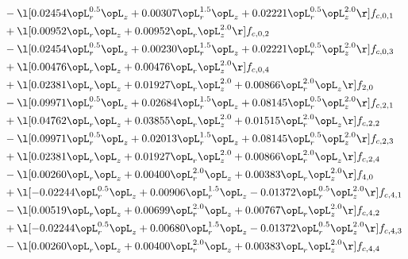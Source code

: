 \begin{alignat}{2}
& - \l[  0.02454 \opL_r^{0.5} \opL_z +  0.00307 \opL_r^{1.5} \opL_z +  0.02221 \opL_r^{0.5} \opL_z^{2.0}  \r] f_{c,0,1} \nonumber \\ 
& + \l[  0.00952 \opL_r \opL_z +  0.00952 \opL_r \opL_z^{2.0}  \r] f_{c,0,2} \nonumber \\ 
& - \l[  0.02454 \opL_r^{0.5} \opL_z +  0.00230 \opL_r^{1.5} \opL_z +  0.02221 \opL_r^{0.5} \opL_z^{2.0}  \r] f_{c,0,3} \nonumber \\ 
& + \l[  0.00476 \opL_r \opL_z +  0.00476 \opL_r \opL_z^{2.0}  \r] f_{c,0,4} \nonumber \\ 
& + \l[  0.02381 \opL_r \opL_z +  0.01927 \opL_r \opL_z^{2.0} +  0.00866 \opL_r^{2.0} \opL_z  \r] f_{2,0} \nonumber \\ 
& - \l[  0.09971 \opL_r^{0.5} \opL_z +  0.02684 \opL_r^{1.5} \opL_z +  0.08145 \opL_r^{0.5} \opL_z^{2.0}  \r] f_{c,2,1} \nonumber \\ 
& + \l[  0.04762 \opL_r \opL_z +  0.03855 \opL_r \opL_z^{2.0} +  0.01515 \opL_r^{2.0} \opL_z  \r] f_{c,2,2} \nonumber \\ 
& - \l[  0.09971 \opL_r^{0.5} \opL_z +  0.02013 \opL_r^{1.5} \opL_z +  0.08145 \opL_r^{0.5} \opL_z^{2.0}  \r] f_{c,2,3} \nonumber \\ 
& + \l[  0.02381 \opL_r \opL_z +  0.01927 \opL_r \opL_z^{2.0} +  0.00866 \opL_r^{2.0} \opL_z  \r] f_{c,2,4} \nonumber \\ 
& - \l[  0.00260 \opL_r \opL_z +  0.00400 \opL_r^{2.0} \opL_z +  0.00383 \opL_r \opL_z^{2.0}  \r] f_{4,0} \nonumber \\ 
& + \l[  -0.02244 \opL_r^{0.5} \opL_z +  0.00906 \opL_r^{1.5} \opL_z   -0.01372 \opL_r^{0.5} \opL_z^{2.0}  \r] f_{c,4,1} \nonumber \\ 
& - \l[  0.00519 \opL_r \opL_z +  0.00699 \opL_r^{2.0} \opL_z +  0.00767 \opL_r \opL_z^{2.0}  \r] f_{c,4,2} \nonumber \\ 
& + \l[  -0.02244 \opL_r^{0.5} \opL_z +  0.00680 \opL_r^{1.5} \opL_z   -0.01372 \opL_r^{0.5} \opL_z^{2.0}  \r] f_{c,4,3} \nonumber \\ 
& - \l[  0.00260 \opL_r \opL_z +  0.00400 \opL_r^{2.0} \opL_z +  0.00383 \opL_r \opL_z^{2.0}  \r] f_{c,4,4} \nonumber \\ 
\end{alignat} 



